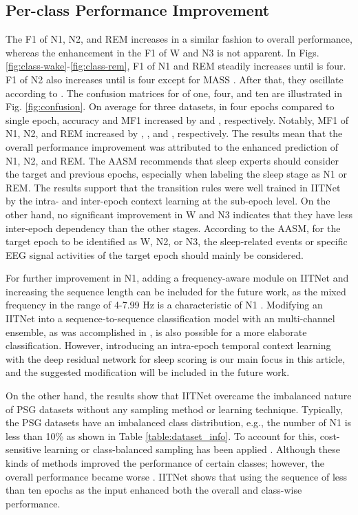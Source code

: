 \documentclass[10pt,twocolumn,twoside]{IEEEtran}
\begin{document}
    \subsection{Per-class Performance Improvement}
    The F1 of N1, N2, and REM increases in a similar fashion to overall performance, whereas the enhancement in the F1 of W and N3 is not apparent. In Figs. \ref{fig:class-wake}-\ref{fig:class-rem}, F1 of N1 and REM steadily increases until  is four. F1 of N2 also increases until  is four except for MASS . After that, they oscillate according to . The confusion matrices for  of one, four, and ten are illustrated in Fig. \ref{fig:confusion}. On average for three datasets, in four epochs compared to single epoch, accuracy and MF1 increased by  and , respectively. Notably, MF1 of N1, N2, and REM increased by , , and , respectively. The results mean that the overall performance improvement was attributed to the enhanced prediction of N1, N2, and REM. The AASM recommends that sleep experts should consider the target and previous epochs, especially when labeling the sleep stage as N1 or REM. The results support that the transition rules were well trained in IITNet by the intra- and inter-epoch context learning at the sub-epoch level. On the other hand, no significant improvement in W and N3 indicates that they have less inter-epoch dependency than the other stages. According to the AASM, for the target epoch to be identified as W, N2, or N3, the sleep-related events or specific EEG signal activities of the target epoch should mainly be considered. 
    
    For further improvement in N1, adding a frequency-aware module on IITNet and increasing the sequence length can be included for the future work, as the mixed frequency in the range of 4-7.99 Hz is a characteristic of N1 \cite{berry2012aasm}. Modifying an IITNet into a sequence-to-sequence classification model with an multi-channel ensemble, as was accomplished in \cite{phan2018joint, phan2019seqsleepnet}, is also possible for a more elaborate classification. However, introducing an intra-epoch temporal context learning with the deep residual network for sleep scoring is our main focus in this article, and the suggested modification will be included in the future work.
   
    On the other hand, the results show that IITNet overcame the imbalanced nature of PSG datasets without any sampling method or learning technique. Typically, the PSG datasets have an imbalanced class distribution, e.g., the number of N1 is less than 10\% as shown in Table \ref{table:dataset_info}. To account for this, cost-sensitive learning or class-balanced sampling has been applied \cite{stephansen2017use,biswal2017sleepnet,dong2018mixed,supratak2017deepsleepnet,tsinalis2016automatic}. Although these kinds of methods improved the performance of certain classes; however, the overall performance became worse \cite{sors2018convolutional}. IITNet shows that using the sequence of less than ten epochs as the input enhanced both the overall and class-wise performance.
    
\end{document}
